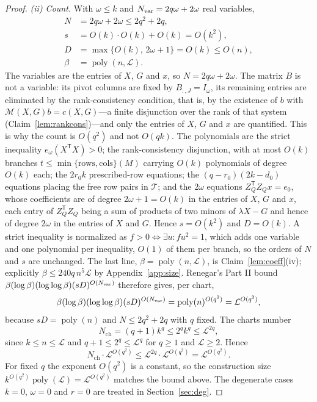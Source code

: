 \documentclass[journal]{IEEEtran}
\theoremstyle{plainn}
\theoremstyle{remark}
\begin{document}
\begin{proof}
\emph{(ii) Count.} With $\omega\le k$ and $N_{\rm var}=2q\omega+2\omega$ real variables,
\begin{align*}
N &= 2q\omega+2\omega\le 2q^2+2q,\\
s &= O(k)\cdot O(k)+O(k)=O(k^2),\\
D &= \max\{O(k),\,2\omega+1\}=O(k)\le O(n),\\
\beta &= \operatorname{poly}(n,\mathcal L).
\end{align*}
The variables are the entries of $X$, $G$ and $x$, so $N=2q\omega+2\omega$. The matrix $B$ is not a
variable: its pivot columns are fixed by $B_{:,J}=I_\omega$, its remaining entries are eliminated by the
rank-consistency condition, that is, by the existence of $b$ with $\mathcal M(X,G)b=c(X,G)$---a finite
disjunction over the rank of that system (Claim~\ref{lem:rankcons})---and only the entries of $X$, $G$
and $x$ are quantified. This is why the count is $O(q^2)$ and not $O(qk)$. The polynomials are the
strict inequality $e_\omega(X^{\mathsf T}X)>0$; the rank-consistency disjunction, with at most $O(k)$
branches $t\le\min\{\text{rows},\text{cols}\}(M)$ carrying $O(k)$ polynomials of degree $O(k)$ each;
the $2r_0k$ prescribed-row equations; the $(q-r_0)(2k-d_0)$ equations placing the free row pairs in
$\mathcal T$; and the $2\omega$ equations $Z_Q^{\mathsf T}Z_Qx=e_0$, whose coefficients are of degree
$2\omega+1=O(k)$ in the entries of $X$, $G$ and $x$, each entry of $Z_Q^{\mathsf T}Z_Q$ being a sum of
products of two minors of $\lambda X-G$ and hence of degree $2\omega$ in the entries of $X$ and $G$.
Hence $s=O(k^2)$ and $D=O(k)$. A strict inequality is normalized as $f>0\iff\exists u: fu^2=1$, which
adds one variable and one polynomial per inequality, $O(1)$ of them per branch, so the orders of $N$
and $s$ are unchanged. The last line, $\beta=\operatorname{poly}(n,\mathcal L)$, is Claim~\ref{lem:coeff}(iv); explicitly
$\beta\le240q\,n^5\mathcal L$ by Appendix~\ref{app:size}. Renegar's Part II bound
$\beta(\log\beta)(\log\log\beta)(sD)^{O(N_{\rm var})}$ therefore gives, per chart,
\begin{equation*}
\beta(\log \beta)(\log\log \beta)(sD)^{O(N_{\rm var})}
=\operatorname{poly}(n)^{O(q^2)}
=\mathcal L^{O(q^2)},
\end{equation*}
because $sD=\operatorname{poly}(n)$ and $N\le 2q^2+2q$ with $q$ fixed. The
charts number
\begin{equation*}
N_{\mathrm{ch}}=(q+1)k^{q}\le 2^{q}k^{q}\le\mathcal L^{2q},
\end{equation*}
since $k\le n\le\mathcal L$ and $q+1\le 2^{q}\le\mathcal L^{q}$ for $q\ge1$
and $\mathcal L\ge2$. Hence
\begin{equation*}
N_{\mathrm{ch}}\cdot\mathcal L^{O(q^2)}
\le\mathcal L^{2q}\cdot\mathcal L^{O(q^2)}
=\mathcal L^{O(q^2)} .
\end{equation*}
For fixed $q$ the exponent $O(q^2)$ is a constant, so the construction size
$k^{O(q^2)}\operatorname{poly}(\mathcal L)=\mathcal L^{O(q^2)}$ matches the bound above. The
degenerate cases $k=0$,
$\omega=0$ and $r=0$ are treated in Section~\ref{sec:deg}.
\end{proof}
\end{document}
